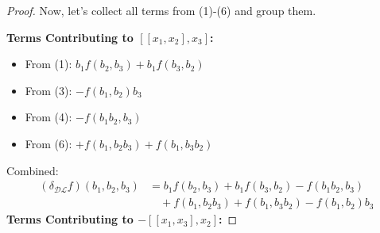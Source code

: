 \documentclass[a4paper, 12pt,oneside,reqno]{amsart}
\newcommand{\DL}{\mathcal{DL}}
\begin{document}
\begin{proof}
Now, let's collect all terms from (1)-(6) and group them.

\textbf{Terms Contributing to $[[x_1,x_2],x_3]$:}

\begin{itemize}
\item From (1): $b_1f(b_2,b_3)+b_1  f(b_3,b_2)$
\item From (3): $-f(b_1, b_2)b_3$
\item From (4): $-f(b_1b_2, b_3)$ 
\item From (6): $+f(b_1,b_2b_3)+f(b_1,b_3b_2)$
\end{itemize}

Combined:
\begin{align*}
(\delta_{\DL} f)(b_1, b_2, b_3) &= b_1 f(b_2,b_3)+b_1 f(b_3,b_2) - f(b_1  b_2, b_3) \\
&\quad + f(b_1, b_2  b_3) + f(b_1, b_3  b_2) - f(b_1,b_2)  b_3
\end{align*}
\textbf{Terms Contributing to $-[[x_1,x_3],x_2]$:}


\end{proof}
\end{document}
